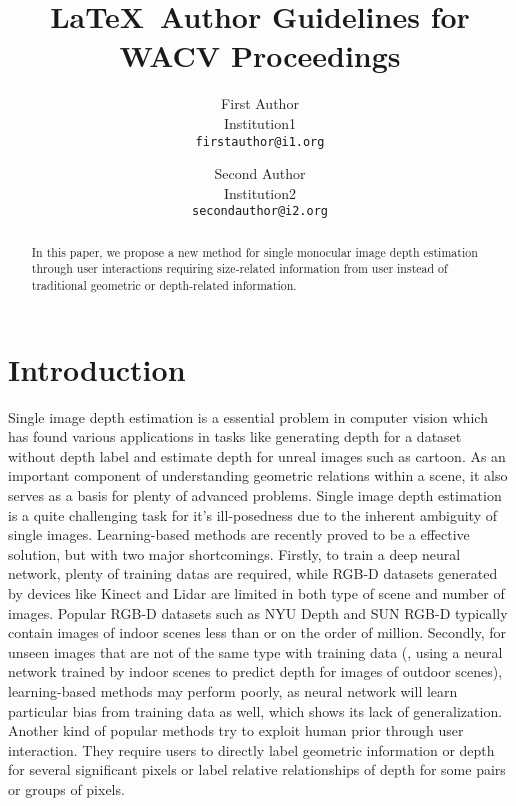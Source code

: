 \documentclass[10pt,twocolumn,letterpaper]{article}
\begin{document}
\title{\LaTeX\ Author Guidelines for WACV Proceedings}

\author{First Author \\
Institution1\\
{\tt\small firstauthor@i1.org}
\and
Second Author \\
Institution2\\
{\tt\small secondauthor@i2.org}
}

\maketitle
\ifwacvfinal\thispagestyle{empty}\fi

\begin{abstract}
   In this paper, we propose a new method for single monocular image depth estimation through user interactions requiring size-related information from user instead of traditional geometric or depth-related information. 
\end{abstract}

\section{Introduction}

Single image depth estimation is a essential problem in computer vision which has found various applications in tasks like generating depth for a dataset without depth label and estimate depth for unreal images such as cartoon. As an important component of understanding geometric relations within a scene, it also serves as a basis for plenty of advanced problems. Single image depth estimation is a quite challenging task for it's ill-posedness due to the inherent ambiguity of single images. Learning-based methods are recently proved to be a effective solution, but with two major shortcomings. Firstly, to train a deep neural network, plenty of training datas are required, while RGB-D datasets generated by devices like Kinect and Lidar are limited in both type of scene and number of images. Popular RGB-D datasets such as NYU Depth \cite{silberman11indoor, Silberman:ECCV12} and SUN RGB-D \cite{SUN} typically contain images of indoor scenes less than or on the order of million. Secondly, for unseen images that are not of the same type with training data (\eg, using a neural network trained by indoor scenes to predict depth for images of outdoor scenes), learning-based methods may perform poorly, as neural network will learn particular bias from training data as well, which shows its lack of generalization. Another kind of popular methods try to exploit human prior through user interaction. They require users to directly label geometric information or depth for several significant pixels or label relative relationships of depth for some pairs or groups of pixels. 
\end{document}
